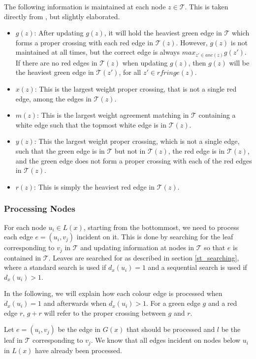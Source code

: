 The following information is maintained at each node $z \in \mathcal{T}$. This is taken directly from \cite{nlogn}, but slightly elaborated.
\begin{itemize}
	\item $g(z)$: After updating $g(z)$, it will hold the heaviest green edge in $\mathcal{T}$ which	forms a proper crossing with each red edge in $\mathcal{T}(z)$.
	\subitem However, $g(z)$ is not maintained at all times, but the correct edge is always $max_{z' \in anc(z)}g(z')$.
	\subitem If there are no red edges in $\mathcal{T}(z)$ when updating $g(z)$, then $g(z)$ will be the heaviest green edge in $\mathcal{T}(z')$, for all $z' \in rfringe(z)$.
	\item $x(z)$: This is the largest weight proper crossing, that is not a single red edge, among the edges in $\mathcal{T}(z)$.
	\item $m(z)$: This is the largest weight agreement matching in $\mathcal{T}$ containing a white edge such that the topmost white edge is in $\mathcal{T}(z)$.
	\item $y(z)$: This the largest weight proper crossing, which is not a single edge, such that the green edge is in $\mathcal{T}$ but not in $\mathcal{T}(z)$, the red edge is in $\mathcal{T}(z)$, and the green edge does not form a proper crossing with each of the red edges in $\mathcal{T}(z)$.
	\item $r(z)$: This is simply the heaviest red edge in $\mathcal{T}(z)$.
\end{itemize}

\subsubsection{Processing Nodes}
For each node $u_i \in L(x)$, starting from the bottommost, we need to process each edge $e = (u_i, v_j)$ incident on it. This is done by searching for the leaf corresponding to $v_j$ in $\mathcal{T}$ and updating information at nodes in $\mathcal{T}$ so that $e$ is contained in $\mathcal{T}$. Leaves are searched for as described in section \ref{st_searching}, where a standard search is used if $d_x(u_i) = 1$ and a sequential search is used if $d_x(u_i) > 1$.

In the following, we will explain how each colour edge is processed when $d_x(u_i) = 1$ and afterwards when $d_x(u_i) > 1$. For a green edge $g$ and a red edge $r$, $g+r$ will refer to the proper crossing between $g$ and $r$.

Let $e=(u_i,v_j)$ be the edge in $G(x)$ that should be processed and $l$ be the leaf in $\mathcal{T}$ corresponding to $v_j$. We know that all edges incident on nodes below $u_i$ in $L(x)$ have already been processed.

